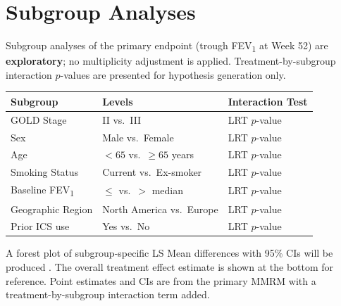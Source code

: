 \section{Subgroup Analyses}

Subgroup analyses of the primary endpoint (trough FEV\textsubscript{1} at Week 52)
are \textbf{exploratory}; no multiplicity adjustment is applied.
Treatment-by-subgroup interaction $p$-values are presented for hypothesis generation only.

\begin{tabularx}{\linewidth}{@{}
  >{\raggedright\arraybackslash}X
  >{\centering\arraybackslash}p{30mm}
  >{\centering\arraybackslash}p{30mm}@{}}
\toprule
\rowcolor{sapfog}
\textbf{Subgroup} & \textbf{Levels} & \textbf{Interaction Test} \\
\midrule
GOLD Stage              & II vs.\ III                  & LRT $p$-value \\
Sex                     & Male vs.\ Female             & LRT $p$-value \\
Age                     & $<65$ vs.\ $\geq65$ years    & LRT $p$-value \\
Smoking Status          & Current vs.\ Ex-smoker       & LRT $p$-value \\
Baseline FEV\textsubscript{1} & $\leq$ vs.\ $>$ median & LRT $p$-value \\
Geographic Region       & North America vs.\ Europe    & LRT $p$-value \\
Prior ICS use           & Yes vs.\ No                  & LRT $p$-value \\
\bottomrule
\end{tabularx}

\begin{tcolorbox}[sapnote, title={\faIcon{chart-bar}\ Forest Plot}]
  A forest plot of subgroup-specific LS Mean differences with 95\% CIs will be
  produced . The overall treatment effect estimate is shown at
  the bottom for reference. Point estimates and CIs are from the primary MMRM
  with a treatment-by-subgroup interaction term added.
\end{tcolorbox}

\clearpage

